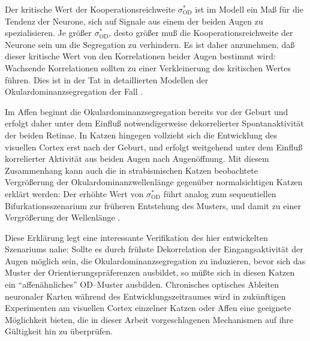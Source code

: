 Der kritische Wert der Kooperationsreichweite $\sigma^\ast_{\text{OD}}$ ist
im Modell ein Maß für die Tendenz der Neurone, sich auf Signale aus einem
der beiden Augen zu spezialisieren. Je größer $\sigma^\ast_{\text{OD}}$,
desto größer muß die Kooperationsreichweite der Neurone sein um die
Segregation zu verhindern. Es ist daher anzunehmen, daß dieser kritische
Wert von den Korrelationen beider Augen bestimmt wird: Wachsende
Korrelationen sollten zu einer Verkleinerung des kritischen Wertes führen.
Dies ist in der Tat in detaillierten Modellen der Okulardominanzsegregation
der Fall \cite{scherf:1994}.

Im Affen beginnt die Okulardominanzsegregation bereits vor der Geburt
\cite{rakic:1981} und erfolgt daher unter dem Einfluß
notwendigerweise dekorrelierter Spontanaktivität der beiden Retinae.  In
Katzen hingegen vollzieht sich die Entwicklung des visuellen Cortex erst
nach der Geburt, und erfolgt weitgehend unter dem Einfluß korrelierter
Aktivität aus beiden Augen nach Augenöffnung.  Mit diesem Zusammenhang
kann auch die in strabismischen Katzen beobachtete Vergrößerung der
Okulardominanzwellenlänge gegenüber normalsichtigen Katzen erklärt
werden: Der erhöhte Wert von $\sigma^\ast_{\text{OD}}$ führt analog zum
sequentiellen Bifurkationsszenarium zur früheren Entstehung des Musters,
und damit zu einer Vergrößerung der Wellenlänge
.

Diese Erklärung legt eine interessante Verifikation des hier entwickelten
Szenariums nahe: Sollte es durch frühste Dekorrelation der Eingangsaktivität
der Augen möglich sein, die Okulardominanzsegregation zu induzieren, bevor
sich das Muster der Orientierungspräferenzen ausbildet, so müßte sich in
diesen Katzen ein ``affenähnliches'' OD--Muster ausbilden.  Chronisches
optisches Ableiten neuronaler Karten während des Entwicklungszeitraumes
wird in zukünftigen Experimenten am visuellen Cortex einzelner Katzen oder
Affen eine geeignete Möglichkeit bieten, die in dieser Arbeit
vorgeschlagenen Mechanismen auf ihre Gültigkeit hin zu überprüfen.

\nocite{hoffsuemmer95a,hoffsuemmer96}

